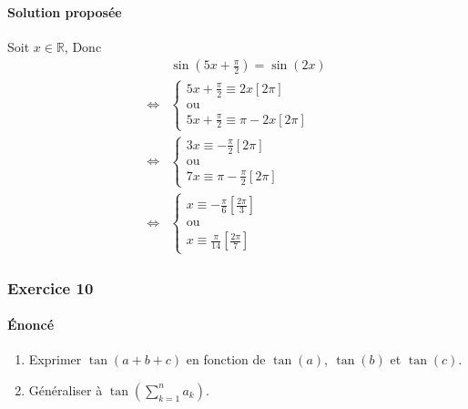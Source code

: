 \documentclass[14pt]{article}
\newcommand{\pr}[1]{\left(#1\right)}
\def\R{\mathbb R}
\def\Ssi{\Longleftrightarrow}
\begin{document}
    \paragraph{Solution proposée} Soit $x\in\R$,
    Donc
    \begin{align*}
        &\sin\pr{5x+\frac\pi2}=\sin(2x)\\
        \Ssi&\begin{cases}5x+\frac\pi2\equiv 2x[2\pi]\\ \text{ou}\\5x+\frac\pi2\equiv\pi- 2x[2\pi] \end{cases}\\
        \Ssi&\begin{cases}3x\equiv-\frac\pi2[2\pi]\\ \text{ou}\\7x\equiv\pi-\frac\pi2[2\pi] \end{cases}\\
        \Ssi&\begin{cases}x\equiv-\frac\pi6\left[\frac{2\pi}3\right]\\\text{ou}\\x\equiv\frac\pi{14}\left[\frac{2\pi}7\right] \end{cases}
    \end{align*}

    \subsubsection*{Exercice 10}
    \paragraph{Énoncé} 
    \begin{enumerate}
        \item Exprimer $\tan(a+b+c)$ en fonction de $\tan(a),\ \tan(b)$ et $\tan(c)$.
        \item Généraliser à $\tan\left(\sum_{k=1}^na_k\right)$.
    \end{enumerate}
    
\end{document}
